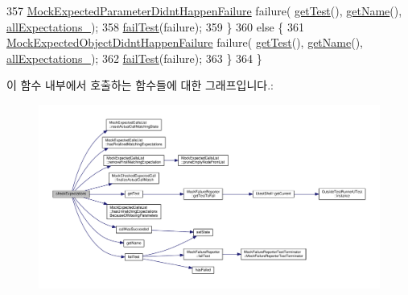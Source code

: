 \begin{DoxyCode}
357         \hyperlink{class_mock_expected_parameter_didnt_happen_failure}{MockExpectedParameterDidntHappenFailure} failure(
      \hyperlink{class_mock_checked_actual_call_aa10112b41f7ed20162b12633042bb775}{getTest}(), \hyperlink{class_mock_checked_actual_call_ab9fb89f09ab681191e4eaa9221b42491}{getName}(), \hyperlink{class_mock_checked_actual_call_aed217603c4a32c8f55a3087ac4a64a78}{allExpectations\_});
358         \hyperlink{class_mock_checked_actual_call_a275e824525aa26cb8874437442cdc186}{failTest}(failure);
359     \}
360     \textcolor{keywordflow}{else} \{
361         \hyperlink{class_mock_expected_object_didnt_happen_failure}{MockExpectedObjectDidntHappenFailure} failure(
      \hyperlink{class_mock_checked_actual_call_aa10112b41f7ed20162b12633042bb775}{getTest}(), \hyperlink{class_mock_checked_actual_call_ab9fb89f09ab681191e4eaa9221b42491}{getName}(), \hyperlink{class_mock_checked_actual_call_aed217603c4a32c8f55a3087ac4a64a78}{allExpectations\_});
362         \hyperlink{class_mock_checked_actual_call_a275e824525aa26cb8874437442cdc186}{failTest}(failure);
363     \}
364 \}
\end{DoxyCode}


이 함수 내부에서 호출하는 함수들에 대한 그래프입니다.\+:
\nopagebreak
\begin{figure}[H]
\begin{center}
\leavevmode
\includegraphics[width=350pt]{class_mock_checked_actual_call_aaf94db2d926ab0a1cae9fc65c7eec54c_cgraph}
\end{center}
\end{figure}




